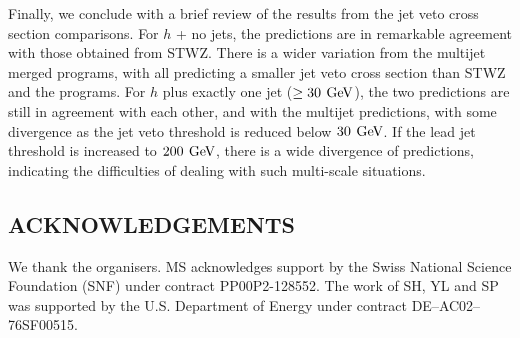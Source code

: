 Finally, we conclude with a brief review of the results from the jet veto 
cross section comparisons. For $h$ + no jets, the \NNLOPS predictions are 
in remarkable agreement with those obtained from STWZ. There is a wider 
variation from the multijet merged programs, with all predicting a smaller 
jet veto cross section than STWZ and the \NNLOPS programs. For $h$ plus 
exactly one jet ($\ge 30\,\text{\:GeV}$), the two \NNLOPS predictions are still in 
agreement with each other, and with the multijet predictions, with some 
divergence as the jet veto threshold is reduced below $30 \,\text{\:GeV}$. If the 
lead jet threshold is increased to $200\,\text{\:GeV}$, there is a wide divergence 
of predictions, indicating the difficulties of dealing with such multi-scale 
situations. 


\subsection*{ACKNOWLEDGEMENTS}

We thank the organisers.
MS acknowledges support by the Swiss National Science Foundation (SNF) 
under contract PP00P2-128552. 
The work of SH, YL and SP was supported by the U.S. Department of Energy 
under contract DE--AC02--76SF00515.
